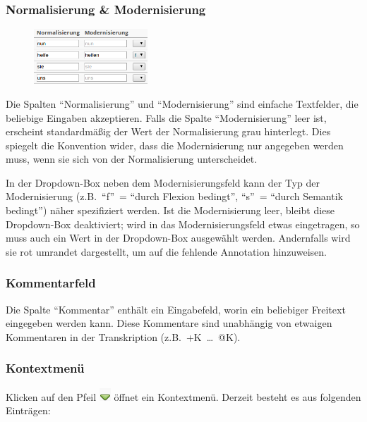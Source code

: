 \documentclass[11pt,a4paper,parskip=half]{scrartcl}
\begin{document}
\subsubsection{Normalisierung \& Modernisierung}

\begin{figure}%
  \begin{center}
    \includegraphics[width=0.38\textwidth]{img/1.2/norm.png}
  \end{center}
\end{figure}

Die Spalten ``Normalisierung'' und ``Modernisierung'' sind einfache Textfelder,
die beliebige Eingaben akzeptieren.  Falls die Spalte ``Modernisierung'' leer
ist, erscheint standardmäßig der Wert der Normalisierung grau hinterlegt.  Dies
spiegelt die Konvention wider, dass die Modernisierung nur angegeben werden
muss, wenn sie sich von der Normalisierung unterscheidet.

In der Dropdown-Box neben dem Modernisierungsfeld kann der Typ der
Modernisierung (z.B.\ ``f''~= ``durch Flexion bedingt'', ``s''~= ``durch
Semantik bedingt'') näher spezifiziert werden.  Ist die Modernisierung leer,
bleibt diese Dropdown-Box deaktiviert; wird in das Modernisierungsfeld etwas
eingetragen, so muss auch ein Wert in der Dropdown-Box ausgewählt werden.
Andernfalls wird sie rot umrandet dargestellt, um auf die fehlende Annotation
hinzuweisen.

\subsubsection{Kommentarfeld}

Die Spalte "`Kommentar"' enthält ein Eingabefeld, worin ein beliebiger
Freitext eingegeben werden kann.  Diese Kommentare sind unabhängig von
etwaigen Kommentaren in der Transkription (z.B.\ +K~\ldots{}~@K).

\subsubsection{Kontextmenü}

\vspace{-.5em} Klicken auf den
Pfeil \includegraphics[height=\baselineskip]{img/dropdown.png} öffnet
ein Kontextmenü.  Derzeit besteht es aus folgenden Einträgen:
\end{document}
